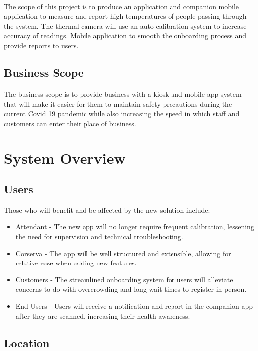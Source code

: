 \documentclass[12pt, letterpaper]{article}
\begin{document}
    \paragraph{}
    The scope of this project is to produce an application and companion mobile application 
    to measure and report high temperatures of people passing through the system. The 
    thermal camera will use an auto calibration system to increase accuracy of 
    readings. Mobile application to smooth the onboarding process and provide reports 
    to users.
    \subsection{Business Scope}
    \paragraph{}
    The business scope is to provide business with a kiosk and mobile app system that will make 
    it easier for them to maintain safety precautions during the current Covid 19 
    pandemic while also increasing the speed in which staff and customers can enter their place of business.
    \section{System Overview}
    \subsection{Users}
    Those who will benefit and be affected by the new solution include:
    \begin{itemize}
        \item Attendant - The new app will no longer require frequent calibration, lessening the need for supervision and technical troubleshooting.
        \item Corserva - The app will be well structured and extensible, allowing for relative ease when adding new features.
        \item Customers - The streamlined onboarding system for users will alleviate concerns to do with overcrowding and long wait times to register in person. 
        \item End Users - Users will receive a notification and report in the companion app after they are scanned, increasing their health awareness.
    \end{itemize}
    \subsection{Location}
\end{document}
